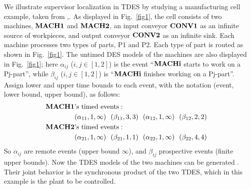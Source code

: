 \documentclass[twocolumn]{autart}
\begin{document}
We illustrate supervisor localization in TDES by studying a
manufacturing cell example, taken from
\cite{BrandinWonham:94},\cite[Section~9.11]{Wonham:2011a}. As
displayed in Fig.~\ref{fig1}, the cell consists of two machines,
$\bf MACH1$ and $\bf MACH2$, an input conveyor $\bf CONV1$ as an
infinite source of workpieces, and output conveyor $\bf CONV2$ as an
infinite sink. Each machine processes two types of parts, P1 and P2.
Each type of part is routed as shown in Fig.~\ref{fig1}.  The
untimed DES models of the machines are also displayed in
Fig.~\ref{fig1}; here $\alpha_{ij}$ ($i,j\in[1,2]$) is the event
``$\bf MACHi$ starts to work on a Pj-part'', while $\beta_{ij}$
($i,j\in[1,2]$) is ``$\bf MACHi$ finishes working on a Pj-part''.
Assign lower and upper time bounds to each event, with the notation
(event, lower bound, upper bound), as follows:
\begin{align*}
{\bf MACH1}&\text{'s timed events}: \\
&(\alpha_{11},1,\infty)~~(\beta_{11},3,3)~~(\alpha_{12},1,\infty)~~(\beta_{12},2,2)\\
{\bf MACH2}&\text{'s timed events}: \\
&(\alpha_{21},1,\infty)~~(\beta_{21},1,1)~~(\alpha_{22},1,\infty)~~(\beta_{22},4,4)
\end{align*}
So $\alpha_{ij}$ are remote events (upper bound $\infty$), and
$\beta_{ij}$ prospective events (finite upper bounds).  Now
the TDES models of the two machines can be generated \cite[p.425]{Wonham:2011a}. Their joint behavior is the synchronous product of
the two TDES, which in this example is the plant to be controlled.
\end{document}
